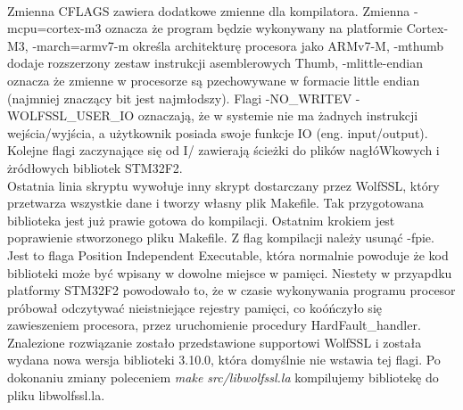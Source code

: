 \documentclass[oneside]{mgr}
\begin{document}
\\Zmienna CFLAGS zawiera dodatkowe zmienne dla kompilatora. Zmienna -mcpu=cortex-m3 oznacza że program będzie wykonywany na platformie Cortex-M3, -march=armv7-m określa architekturę procesora jako ARMv7-M, -mthumb dodaje rozszerzony zestaw instrukcji asemblerowych Thumb, -mlittle-endian oznacza że zmienne w procesorze są pzechowywane w formacie little endian (najmniej znaczący bit jest najmłodszy). Flagi -NO\_WRITEV -WOLFSSL\_USER\_IO oznaczają, że w systemie nie ma żadnych instrukcji wejścia/wyjścia, a użytkownik posiada swoje funkcje IO (eng. input/output). Kolejne flagi zaczynające się od I/ zawierają ścieżki do plików nagłóWkowych i żródłowych bibliotek STM32F2.
\\Ostatnia linia skryptu wywołuje inny skrypt dostarczany przez WolfSSL, który przetwarza wszystkie dane i tworzy własny plik Makefile.
Tak przygotowana biblioteka jest już prawie gotowa do kompilacji. Ostatnim krokiem jest poprawienie stworzonego pliku Makefile. Z flag kompilacji należy usunąć -fpie. Jest to flaga Position Independent Executable, która normalnie powoduje że kod biblioteki może być wpisany w dowolne miejsce w pamięci. Niestety w przyapdku platformy STM32F2 powodowało to, że w czasie wykonywania programu procesor próbował odczytywać nieistniejące rejestry pamięci, co koóńczyło się zawieszeniem procesora, przez uruchomienie procedury HardFault\_handler. Znalezione rozwiązanie zostało przedstawione supportowi WolfSSL i została wydana nowa wersja biblioteki 3.10.0, która domyślnie nie wstawia tej flagi. Po dokonaniu zmiany poleceniem \textit{make src/libwolfssl.la} kompilujemy bibliotekę do pliku libwolfssl.la. 
\end{document}

